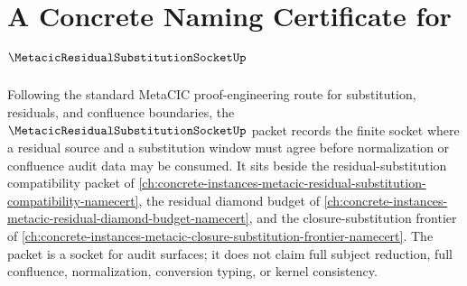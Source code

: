\chapter{A Concrete Naming Certificate for $\MetacicResidualSubstitutionSocketUp$}
\label{ch:concrete-instances-metacic-residual-substitution-socket-namecert}

Following the standard MetaCIC proof-engineering route for substitution, residuals, and confluence boundaries, the $\MetacicResidualSubstitutionSocketUp$ packet records the finite socket where a residual source and a substitution window must agree before normalization or confluence audit data may be consumed. It sits beside the residual-substitution compatibility packet of \autoref{ch:concrete-instances-metacic-residual-substitution-compatibility-namecert}, the residual diamond budget of \autoref{ch:concrete-instances-metacic-residual-diamond-budget-namecert}, and the closure-substitution frontier of \autoref{ch:concrete-instances-metacic-closure-substitution-frontier-namecert}. The packet is a socket for audit surfaces; it does not claim full subject reduction, full confluence, normalization, conversion typing, or kernel consistency.

